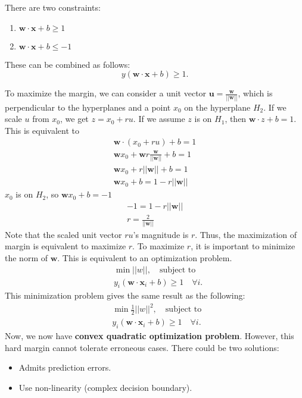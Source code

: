 There are two constraints:
\begin{enumerate}
	\item $\mathbf{w}\cdot \mathbf{x}+b\geq1$
	\item $\mathbf{w}\cdot \mathbf{x}+b\leq-1$
\end{enumerate}
These can be combined as follows:
$$y(\mathbf{w}\cdot \mathbf{x}+b)\geq 1.$$

To maximize the margin, we can consider a unit vector $\mathbf{u} = \frac{\mathbf{w}}{||\mathbf{w}||}$, which is perpendicular to the hyperplanes and a point $x_0$ on the hyperplane $H_2$. If we scale $u$ from $x_0$, we get $z = x_0+ru$. If we assume $z$ is on $H_1$, then $\mathbf{w}\cdot z +b=1$. This is equivalent to 
\begin{align*}
	\mathbf{w}\cdot (x_0+ru)+b=1\\
	\mathbf{w}x_0+\mathbf{w}r\frac{\mathbf{w}}{||\mathbf{w}||}+b=1\\
	\mathbf{w}x_0+r||\mathbf{w}||+b=1\\
	\mathbf{w}x_0+b=1-r||\mathbf{w}||
\end{align*}
$x_0$ is on $H_2$, so $\mathbf{w}x_0+b=-1$
\begin{align*}
	-1=1-r||\mathbf{w}||\\
	r=\frac{2}{||\mathbf{w}||}
\end{align*}
Note that the scaled unit vector $ru$'s magnitude is $r$. Thus, the maximization of margin is equivalent to maximize $r$. To maximize $r$, it is important to minimize the norm of $\mathbf{w}$. This is equivalent to an optimization problem. 
\begin{align*}
	&\min ||w||,\quad \textrm{subject to } \\
	&y_i(\mathbf{w}\cdot \mathbf{x}_i+b)\geq 1 \quad\forall i.
\end{align*}
This minimization problem gives the same result as the following:  
\begin{align*}
	&\min \frac{1}{2}||w||^2,\quad \textrm{subject to } \\
	&y_i(\mathbf{w}\cdot \mathbf{x}_i+b)\geq 1 \quad\forall i.
\end{align*}
Now, we now have \textbf{convex quadratic optimization problem}. However, this hard margin cannot tolerate erroneous cases. There could be two solutions:
\begin{itemize}
	\item Admits prediction errors. 
	\item Use non-linearity (complex decision boundary).
\end{itemize}

